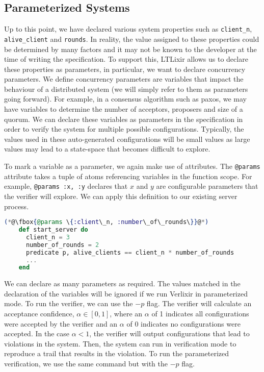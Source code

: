 \subsection{Parameterized Systems}
Up to this point, we have declared various system properties such as \texttt{client\_n}, \texttt{alive\_client} and \texttt{rounds}. In reality, the value assigned to these properties could be determined by many factors and it may not be known to the developer at the time of writing the specification. To support this, LTLixir allows us to declare these properties as parameters, in particular, we want to declare concurrency parameters. We define concurrency parameters are variables that impact the behaviour of a distributed system (we will simply refer to them as parameters going forward). For example, in a consensus algorithm such as paxos, we may have variables to determine the number of acceptors, proposers and size of a quorum. We can declare these variables as parameters in the specification in order to verify the system for multiple possible configurations. Typically, the values used in these auto-generated configurations will be small values as large values may lead to a state-space that becomes difficult to explore.
\par
To mark a variable as a parameter, we again make use of attributes. The \texttt{@params} attribute takes a tuple of atoms referencing variables in the function scope. For example, \texttt{@params {:x, :y}} declares that $x$ and $y$ are configurable parameters that the verifier will explore. We can apply this definition to our existing server process.
\begin{lstlisting}[language=Elixir, xleftmargin=.3\linewidth, caption={Example of declaring concurrency parameters in specification.}]
    (*@\fbox{@params \{:client\_n, :number\_of\_rounds\}}@*)
    def start_server do
      client_n = 3
      number_of_rounds = 2
      predicate p, alive_clients == client_n * number_of_rounds
      ...
    end
\end{lstlisting}
We can declare as many parameters as required. The values matched in the declaration of the variables will be ignored if we run Verlixir in parameterized mode. To run the verifier, we can use the $-p$ flag. The verifier will calculate an acceptance confidence, \(\alpha \in [0, 1]\), where an $\alpha$ of 1 indicates all configurations were accepted by the verifier and an $\alpha$ of 0 indicates no configurations were accepted. In the case $\alpha < 1$, the verifier will output configurations that lead to violations in the system. Then, the system can run in verification mode to reproduce a trail that results in the violation. To run the parameterized verification, we use the same command but with the $-p$ flag.
